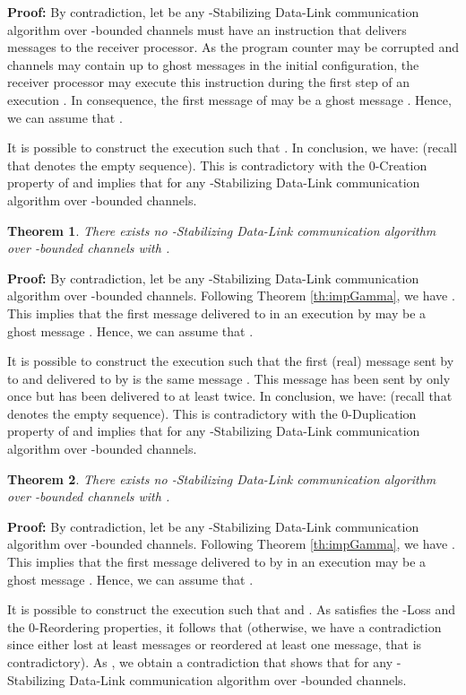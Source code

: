 \documentclass[11pt]{article}
\newtheorem{theorem}{Theorem}
\newenvironment{proof}{\noindent\textbf{Proof:}}{\hfill}
\begin{document}
\begin{proof}
By contradiction, let  be any -Stabilizing Data-Link communication algorithm over -bounded channels must have an instruction that delivers messages to the receiver processor. As the program counter may be corrupted and channels may contain up to  ghost messages in the initial configuration, the receiver processor may execute this instruction during the first step of an execution . In consequence, the first message of  may be a ghost message . Hence, we can assume that .

It is possible to construct the execution  such that . In conclusion, we have:  (recall that  denotes the empty sequence). This is contradictory with the 0-Creation property of  and implies that  for any -Stabilizing Data-Link communication algorithm over -bounded channels.
\end{proof}

\begin{theorem}\label{th:impBeta}
There exists no -Stabilizing Data-Link communication algorithm over -bounded channels with .
\end{theorem}

\begin{proof}
By contradiction, let  be any -Stabilizing Data-Link communication algorithm over -bounded channels. Following Theorem \ref{th:impGamma}, we have . This implies that the first message delivered to  in an execution  by  may be a ghost message . Hence, we can assume that .

It is possible to construct the execution  such that the first (real) message sent by  to  and delivered to  by  is the same message . This message has been sent by  only once but has been delivered to  at least twice. In conclusion, we have:  (recall that  denotes the empty sequence). This is contradictory with the 0-Duplication property of  and implies that  for any -Stabilizing Data-Link communication algorithm over -bounded channels.
\end{proof}

\begin{theorem}\label{th:impDelta}
There exists no -Stabilizing Data-Link communication algorithm over -bounded channels with .
\end{theorem}

\begin{proof}
By contradiction, let  be any -Stabilizing Data-Link communication algorithm over -bounded channels. Following Theorem \ref{th:impGamma}, we have .  This implies that the first message delivered to  by  in an execution  may be a ghost message . Hence, we can assume that .

It is possible to construct the execution  such that  and . As  satisfies the -Loss and the 0-Reordering properties, it follows that  (otherwise, we have a contradiction since either  lost at least  messages or reordered at least one message, that is contradictory). As , we obtain a contradiction that shows that  for any -Stabilizing Data-Link communication algorithm over -bounded channels.
\end{proof}
\end{document}
